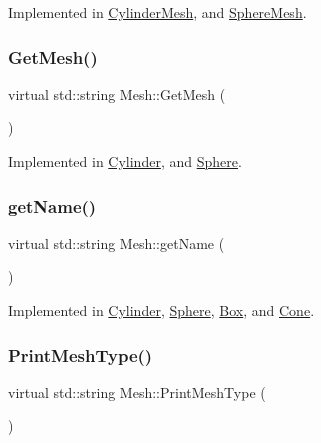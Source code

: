 Implemented in \mbox{\hyperlink{class_cylinder_mesh_a7415f90e56862321e09bcf6088a335a0}{Cylinder\+Mesh}}, and \mbox{\hyperlink{class_sphere_mesh_a1c490b89552f51b7960dc760ac09edf8}{Sphere\+Mesh}}.

\mbox{\label{class_mesh_ac9a0bc76a4e34c3985cbc4c20692c7df}} 
\subsubsection{\texorpdfstring{GetMesh()}{GetMesh()}}
{\footnotesize\ttfamily virtual std\+::string Mesh\+::\+Get\+Mesh (\begin{DoxyParamCaption}{ }\end{DoxyParamCaption})\hspace{0.3cm}{\ttfamily [pure virtual]}}



Implemented in \mbox{\hyperlink{class_cylinder_adada3adc010fbd6530969b3f7845c727}{Cylinder}}, and \mbox{\hyperlink{class_sphere_afd7c86e5319c93163781df0e44cbfd49}{Sphere}}.

\mbox{\label{class_mesh_aa131fe1c2586fe60988155db77c57272}} 
\subsubsection{\texorpdfstring{getName()}{getName()}}
{\footnotesize\ttfamily virtual std\+::string Mesh\+::get\+Name (\begin{DoxyParamCaption}{ }\end{DoxyParamCaption})\hspace{0.3cm}{\ttfamily [pure virtual]}}



Implemented in \mbox{\hyperlink{class_cylinder_afdb7f76b3f02471d638c36127395d181}{Cylinder}}, \mbox{\hyperlink{class_sphere_a173e667086ecd8b9d972e1d6f9885d9d}{Sphere}}, \mbox{\hyperlink{class_box_ac8792393d053c6cac65a36e5c1f27f15}{Box}}, and \mbox{\hyperlink{class_cone_a9581010134e3d1fe079fe5cce1933786}{Cone}}.

\mbox{\label{class_mesh_a0d34fc4317a5e3bc2437b610141b9109}} 
\subsubsection{\texorpdfstring{PrintMeshType()}{PrintMeshType()}}
{\footnotesize\ttfamily virtual std\+::string Mesh\+::\+Print\+Mesh\+Type (\begin{DoxyParamCaption}{ }\end{DoxyParamCaption})\hspace{0.3cm}{\ttfamily [pure virtual]}}



